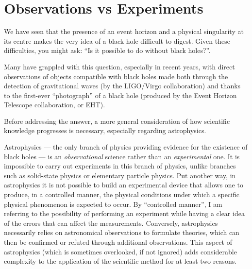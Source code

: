 \section{Observations vs Experiments}\label{sec:06-observations}

We have seen that the presence of an event horizon and a physical
singularity at its centre makes the very idea of a black hole
difficult to digest. Given these difficulties, you might ask: ``Is it possible to do
without black holes?''.

Many have grappled with this question, especially in recent years, with direct
observations of objects compatible with black holes made both through the detection of
gravitational waves (by the LIGO/Virgo collaboration) and thanks to
the first-ever ``photograph'' of a black hole (produced by the Event Horizon
Telescope collaboration, or EHT).

Before addressing the answer, a more general consideration of how scientific knowledge
progresses is necessary, especially regarding astrophysics.

Astrophysics --- the only branch of physics providing evidence for the existence of
black holes --- is an \emph{observational}  science
rather than an \emph{experimental} one. It is
impossible to carry out experiments in this branch of physics, unlike branches such as
solid-state physics or elementary particle physics. Put another way, in astrophysics it
is not possible to build an experimental device that allows one to produce, in a
controlled manner, the physical conditions under which a specific physical phenomenon is
expected to occur. By ``controlled manner'', I am referring to the possibility of
performing an experiment while having a clear idea of the errors that can affect the
measurements. Conversely, astrophysics necessarily relies on astronomical observations
to formulate theories, which can then be confirmed or refuted through additional
observations. This aspect of astrophysics (which is sometimes overlooked, if not
ignored) adds considerable complexity to the application of the scientific method for at
least two reasons.

